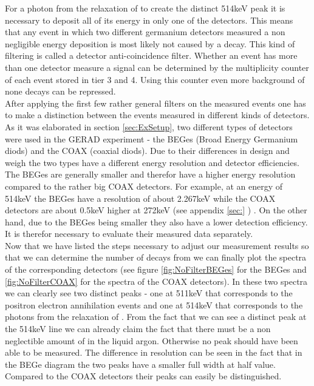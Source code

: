 \documentclass[encoding=utf8,british]{tumphthesis}
\begin{document}
For a photon from the relaxation of  to create the distinct 514keV peak it is necessary to deposit all of its energy in only one of the detectors. 
This means that any event in which two different germanium detectors measured a non negligible energy deposition is most likely not caused by a \Kr decay.
This kind of filtering is called a detector anti-coincidence filter.
Whether an event has more than one detector measure a signal can be determined by the multiplicity counter of each event stored in tier 3 and 4.
Using this counter even more background of none \Kr decays can be repressed.
\\

After applying the first few rather general filters on the measured events one has to make a distinction between the events measured in different kinds of detectors.
As it was elaborated in section \ref{sec:ExSetup}, two different types of detectors were used in the GERAD experiment - the BEGes (Broad Energy Germanium diods) and the COAX (coaxial diods). 
Due to their differences in design and weigh the two types have a different energy resolution and detector efficiencies. 
The BEGes are generally smaller and therefor have a higher energy resolution compared to the rather big COAX detectors.
For example, at an energy of 514keV the BEGes have a resolution of about 2.267keV while the COAX detectors are about 0.5keV higher at 272keV (see appendix \ref{sec:} ) \cite{agostini_allardt_bakalyarov_barabanov_baudis_bauer_bellotti_belogurov_belyaev_benato_et al._2017}. 
On the other hand, due to the BEGes being smaller they also have a lower detection efficiency.
It is therefor necessary to evaluate their measured data separately.
\\

Now that we have listed the steps necessary to adjust our measurement results so that we can determine the number of decays from we can finally plot the spectra of the corresponding detectors (see figure \ref{fig:NoFilterBEGes} for the BEGes and \ref{fig:NoFilterCOAX} for the spectra of the COAX detectors). 
In these two spectra we can clearly see two distinct peaks - one at 511keV that corresponds to the positron electron annihilation events and one at 514keV that corresponds to the photons from the relaxation of .
From the fact that we can see a distinct peak at the 514keV line we can already claim the fact that there must be a non neglectible amount of \Kr in the liquid argon.
Otherwise no peak should have been able to be measured. 
The difference in resolution can be seen in the fact that in the BEGe diagram the two peaks have a smaller full width at half value.
Compared to the COAX detectors their peaks can easily be distinguished.  
\\
\end{document}
